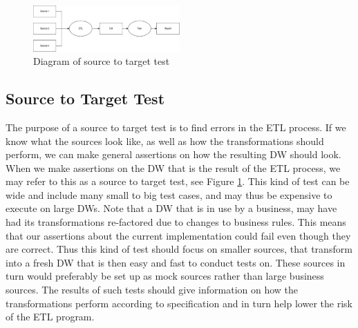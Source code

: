 \begin{figure}
  \centering
		\includegraphics[width=0.5\textwidth]{figures/scenario.pdf}
  \caption{Diagram of source to target test}
	\label{fig:sourcetotarget}
\end{figure}


\subsection{Source to Target Test}
The purpose of a source to target test is to find errors in the ETL process. If we know what the sources look like, as well as how the transformations should perform, we can make general assertions on how the resulting DW should look. When we make assertions on the DW that is the result of the ETL process,  we may refer to this as a source to target test, see Figure \ref{fig:sourcetotarget}. This kind of test can be wide and include many small to big test cases, and may thus be expensive to execute on large DWs. Note that a DW that is in use by a business, may have had its transformations re-factored due to changes to business rules. This means that our assertions about the current implementation could fail even though they are correct. Thus this kind of test should focus on smaller sources, that transform into a fresh DW that is then easy and fast to conduct tests on. These sources in turn would preferably be set up as mock sources rather than large business sources. The results of such tests should give information on how the transformations perform according to specification and in turn help lower the risk of the ETL program.






